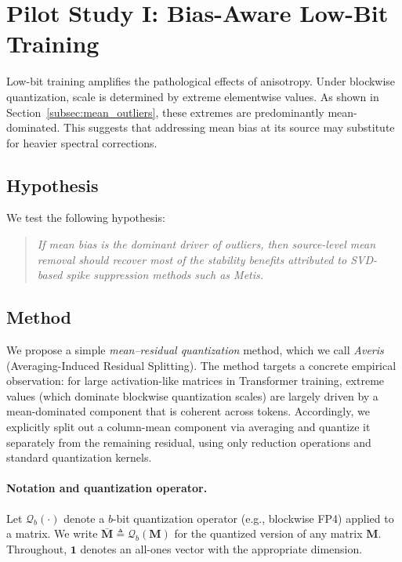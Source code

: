 \section{Pilot Study I: Bias-Aware Low-Bit Training}
\label{sec:lowbit_pilot}

Low-bit training amplifies the pathological effects of anisotropy.
Under blockwise quantization, scale is determined by extreme elementwise values.
As shown in Section~\ref{subsec:mean_outliers},
these extremes are predominantly mean-dominated.
This suggests that addressing mean bias at its source may substitute
for heavier spectral corrections.

\subsection{Hypothesis}

We test the following hypothesis:

\begin{quote}
\emph{If mean bias is the dominant driver of outliers,
then source-level mean removal should recover most of the stability
benefits attributed to SVD-based spike suppression methods such as Metis.}
\end{quote}

\subsection{Method}

We propose a simple \emph{mean--residual quantization} method, which we call
\emph{Averis} (Averaging-Induced Residual Splitting).
The method targets a concrete empirical observation: for large activation-like matrices in Transformer
training, extreme values (which dominate blockwise quantization scales) are largely driven by a
mean-dominated component that is coherent across tokens.
Accordingly, we explicitly split out a column-mean component via averaging and quantize it separately
from the remaining residual, using only reduction operations and standard quantization kernels.

\paragraph{Notation and quantization operator.}
Let $\mathcal{Q}_b(\cdot)$ denote a $b$-bit quantization operator (e.g., blockwise FP4) applied to a matrix.
We write $\bar{\mathbf{M}}\triangleq \mathcal{Q}_b(\mathbf{M})$ for the quantized version of any matrix
$\mathbf{M}$.
Throughout, $\mathbf{1}$ denotes an all-ones vector with the appropriate dimension.

